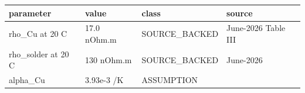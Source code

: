 \documentclass[10pt,]{article}
\begin{document}
\begin{longtable}[]{@{}llll@{}}
\toprule
\begin{minipage}[b]{0.22\columnwidth}\raggedright
parameter\strut
\end{minipage} & \begin{minipage}[b]{0.22\columnwidth}\raggedright
value\strut
\end{minipage} & \begin{minipage}[b]{0.22\columnwidth}\raggedright
class\strut
\end{minipage} & \begin{minipage}[b]{0.22\columnwidth}\raggedright
source\strut
\end{minipage}\tabularnewline
\midrule
\endhead
\begin{minipage}[t]{0.22\columnwidth}\raggedright
rho\_Cu at 20 C\strut
\end{minipage} & \begin{minipage}[t]{0.22\columnwidth}\raggedright
17.0 nOhm.m\strut
\end{minipage} & \begin{minipage}[t]{0.22\columnwidth}\raggedright
SOURCE\_BACKED\strut
\end{minipage} & \begin{minipage}[t]{0.22\columnwidth}\raggedright
June-2026 Table III\strut
\end{minipage}\tabularnewline
\begin{minipage}[t]{0.22\columnwidth}\raggedright
rho\_solder at 20 C\strut
\end{minipage} & \begin{minipage}[t]{0.22\columnwidth}\raggedright
130 nOhm.m\strut
\end{minipage} & \begin{minipage}[t]{0.22\columnwidth}\raggedright
SOURCE\_BACKED\strut
\end{minipage} & \begin{minipage}[t]{0.22\columnwidth}\raggedright
June-2026\strut
\end{minipage}\tabularnewline
\begin{minipage}[t]{0.22\columnwidth}\raggedright
alpha\_Cu\strut
\end{minipage} & \begin{minipage}[t]{0.22\columnwidth}\raggedright
3.93e-3 /K\strut
\end{minipage} & \begin{minipage}[t]{0.22\columnwidth}\raggedright
ASSUMPTION\strut
\end{minipage} & \begin{minipage}[t]{0.22\columnwidth}\raggedright

\end{minipage}
\end{longtable}
\end{document}
